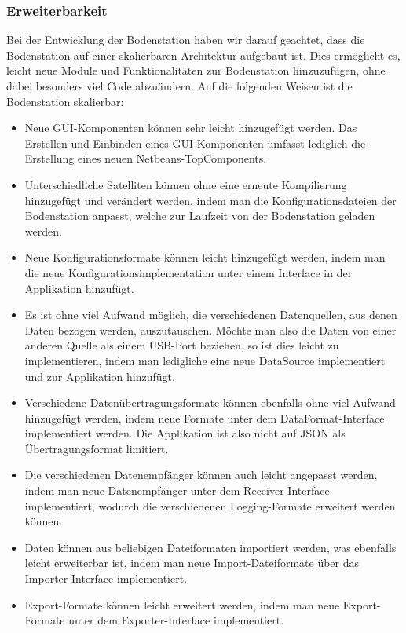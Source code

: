 \subsubsection{Erweiterbarkeit}
Bei der Entwicklung der Bodenstation haben wir darauf geachtet, dass die Bodenstation auf einer skalierbaren Architektur aufgebaut ist. Dies ermöglicht es, leicht neue Module und Funktionalitäten zur Bodenstation hinzuzufügen, ohne dabei besonders viel Code abzuändern. Auf die folgenden Weisen ist die Bodenstation skalierbar:
\begin{itemize}
	\item Neue GUI-Komponenten können sehr leicht hinzugefügt werden. Das Erstellen und Einbinden eines GUI-Komponenten umfasst lediglich die Erstellung eines neuen Netbeans-TopComponents.
	\item Unterschiedliche Satelliten können ohne eine erneute Kompilierung hinzugefügt und verändert werden, indem man die Konfigurationsdateien der Bodenstation anpasst, welche zur Laufzeit von der Bodenstation geladen werden.
	\item Neue Konfigurationsformate können leicht hinzugefügt werden, indem man die neue Konfigurationsimplementation unter einem Interface in der Applikation hinzufügt.
	\item Es ist ohne viel Aufwand möglich, die verschiedenen Datenquellen, aus denen Daten bezogen werden, auszutauschen. Möchte man also die Daten von einer anderen Quelle als einem USB-Port beziehen, so ist dies leicht zu implementieren, indem man ledigliche eine neue DataSource implementiert und zur Applikation hinzufügt.
	\item Verschiedene Datenübertragungsformate können ebenfalls ohne viel Aufwand hinzugefügt werden, indem neue Formate unter dem DataFormat-Interface implementiert werden. Die Applikation ist also nicht auf JSON als Übertragungsformat limitiert.
	\item Die verschiedenen Datenempfänger können auch leicht angepasst werden, indem man neue Datenempfänger unter dem Receiver-Interface implementiert, wodurch die verschiedenen Logging-Formate erweitert werden können.
	\item Daten können aus beliebigen Dateiformaten importiert werden, was ebenfalls leicht erweiterbar ist, indem man neue Import-Dateiformate über das Importer-Interface implementiert.
	\item Export-Formate können leicht erweitert werden, indem man neue Export-Formate unter dem Exporter-Interface implementiert.
\end{itemize}


